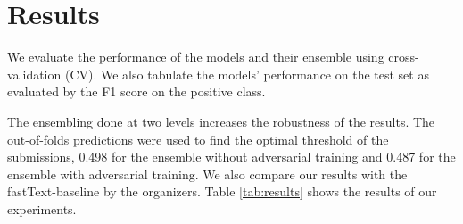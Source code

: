 \documentclass[11pt,a4paper]{article}
\begin{document}
\section{Results}
\label{sec:results}

We evaluate the performance of the models and their ensemble using cross-validation (CV). We also tabulate the models' performance on the test set as evaluated by the F1 score on the positive class. 



The ensembling done at two levels increases the robustness of the results. The out-of-folds predictions were used to find the optimal threshold of the submissions, 0.498 for the ensemble without adversarial training and 0.487 for the ensemble with adversarial training. We also compare our results with the fastText-baseline \citep{joulin2016bag} by the organizers. Table \ref{tab:results} shows the results of our experiments.
\end{document}
